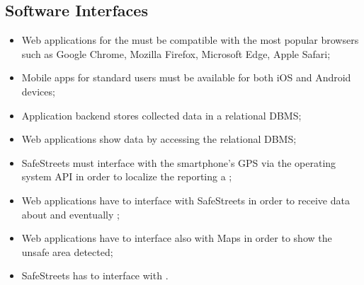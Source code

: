 \documentclass[../../../RASD.tex]{subfiles}
\begin{document}
\subsection{Software Interfaces\label{sect:3.1.3}}
\begin{itemize}
	\item Web applications for the  must be compatible with the most popular browsers such as Google Chrome, Mozilla Firefox, Microsoft Edge, Apple Safari; 
	\item Mobile apps for standard users must be available for both iOS and Android devices;
	\item Application backend stores collected data in a relational DBMS; 
	\item Web applications show data by accessing the relational DBMS; 
	\item SafeStreets must interface with the smartphone's GPS via the operating system API in order to localize the  reporting a ;
	\item Web applications have to interface with SafeStreets in order to receive data about  and eventually ;
	\item Web applications have to interface also with Maps in order to show the unsafe area detected; 
	\item SafeStreets has to interface with .
	 
\end{itemize}
\end{document}
